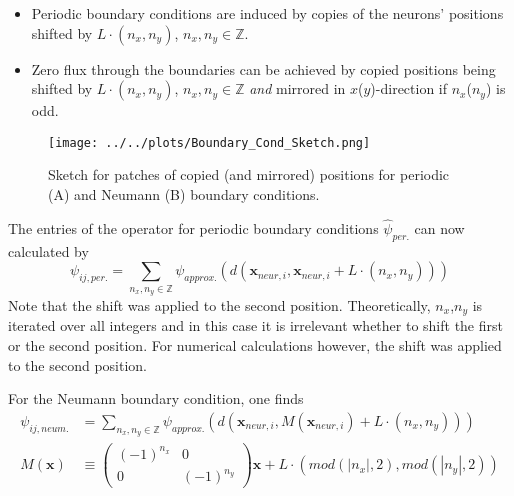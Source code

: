 \documentclass[10pt,a4paper]{article}
\begin{document}
\begin{itemize}
\item Periodic boundary conditions are induced by copies of the neurons' positions shifted by $L\cdot (n_x,n_y)$, $n_x,n_y \in \mathbb{Z}$.
\item Zero flux through the boundaries can be achieved by copied positions being shifted by $L\cdot (n_x,n_y)$, $n_x,n_y \in \mathbb{Z}$ \textit{and} mirrored in $x$($y$)-direction if $n_x$($n_y$) is odd.
\end{itemize}

\begin{figure}
\begin{center}
\texttt{[image: ../../plots/Boundary\_Cond\_Sketch.png]}
\end{center}
\caption{Sketch for patches of copied (and mirrored) positions for periodic (A) and Neumann (B) boundary conditions.}
\label{Bound_Cond_Patches}
\end{figure}

The entries of the operator for periodic boundary conditions $\hat{\psi}_{per.}$ can now calculated by
\begin{equation}
\psi_{ij,per.} = \sum_{n_x,n_y \in \mathbb{Z}} \psi_{approx.} (d(\mathbf{x}_{neur,i},\mathbf{x}_{neur,i} + L \cdot (n_x,n_y)))
\label{Psi_entries_periodic_bound}
\end{equation}
Note that the shift was applied to the second position. Theoretically, $n_x$,$n_y$ is iterated over all integers and in this case it is irrelevant whether to shift the first or the second position. For numerical calculations however, the shift was applied to the second position.

For the Neumann boundary condition, one finds
\begin{align}
\psi_{ij,neum.} &= \sum_{n_x,n_y \in \mathbb{Z}} \psi_{approx.} \left( d(\mathbf{x}_{neur,i},M(\mathbf{x}_{neur,i}) + L \cdot (n_x,n_y)) \right) \label{Psi_entries_neumann_bound} \\
M(\mathbf{x}) &\equiv  
 \begin{pmatrix}
  (-1)^{n_x} & 0\\
  0 & (-1)^{n_y}
 \end{pmatrix}
\mathbf{x} + L \cdot (mod(\left| n_x\right|,2),mod(\left| n_y\right|,2)) \label{Mirror_Operator}
\end{align}
\end{document}
